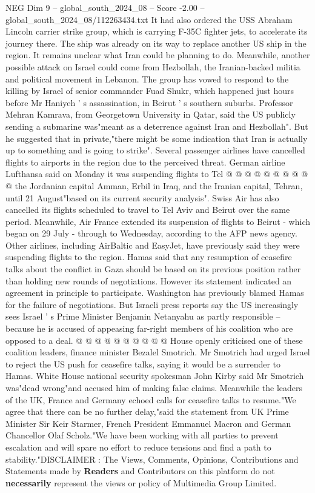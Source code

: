 \begin{textsample}{NEG Dim 9 – global\_south\_2024\_08 – Score -2.00 – global\_south\_2024\_08/112263434.txt}  \label{ex:f9_neg_336}
It had also ordered the USS Abraham Lincoln carrier strike group, which is carrying F-35C fighter jets, to accelerate its journey there.
The ship was already on its way to replace another US ship in the region.
It remains unclear what Iran could be planning to do.
Meanwhile, another possible attack on Israel could come from Hezbollah, the Iranian-backed militia and political movement in Lebanon.
The group has vowed to respond to the killing by Israel of senior commander Fuad Shukr, which happened just hours before Mr Haniyeh ' s assassination, in Beirut ' s southern suburbs.
Professor Mehran Kamrava, from Georgetown University in Qatar, said the US publicly sending a submarine was"meant as a deterrence against Iran and Hezbollah".
But he suggested that in private,"there might be some indication that Iran is actually up to something and is going to strike".
Several passenger airlines have cancelled flights to airports in the region due to the perceived threat.
German airline Lufthansa said on Monday it was suspending flights to Tel @ @ @ @ @ @ @ @ @ @ the Jordanian capital Amman, Erbil in Iraq, and the Iranian capital, Tehran, until 21 August"based on its current security analysis".
Swiss Air has also cancelled its flights scheduled to travel to Tel Aviv and Beirut over the same period.
Meanwhile, Air France extended its suspension of flights to Beirut - which began on 29 July - through to Wednesday, according to the AFP news agency.
Other airlines, including AirBaltic and EasyJet, have previously said they were suspending flights to the region.
Hamas said that any resumption of ceasefire talks about the conflict in Gaza should be based on its previous position rather than holding new rounds of negotiations.
However its statement indicated an agreement in principle to participate.
Washington has previously blamed Hamas for the failure of negotiations.
But Israeli press reports say the US increasingly sees Israel ' s Prime Minister Benjamin Netanyahu as partly responsible -- because he is accused of appeasing far-right members of his coalition who are opposed to a deal. @ @ @ @ @ @ @ @ @ @ House openly criticised one of these coalition leaders, finance minister Bezalel Smotrich.
Mr Smotrich had urged Israel to reject the US push for ceasefire talks, saying it would be a surrender to Hamas.
White House national security spokesman John Kirby said Mr Smotrich was"dead wrong"and accused him of making false claims.
Meanwhile the leaders of the UK, France and Germany echoed calls for ceasefire talks to resume."We agree that there can be no further delay,"said the statement from UK Prime Minister Sir Keir Starmer, French President Emmanuel Macron and German Chancellor Olaf Scholz."We have been working with all parties to prevent escalation and will spare no effort to reduce tensions and find a path to stability."DISCLAIMER : The Views, Comments, Opinions, Contributions and Statements made by \textbf{Readers} and Contributors on this platform do not \textbf{necessarily} represent the views or policy of Multimedia Group Limited.

\end{textsample}
